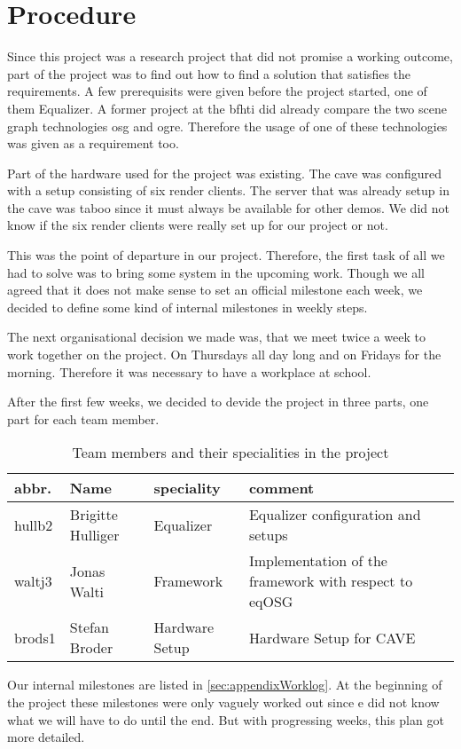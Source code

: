 \chapter{Procedure}

Since this project was a research project that did not promise a working outcome, part of the project was to find out how to find a solution that satisfies the requirements. 
A few prerequisits were given before the project started, one of them Equalizer. A former project at the \gls{bfhti} did already compare the two scene graph technologies \gls{osg} and \gls{ogre}. Therefore the usage of one of these technologies was given as a requirement too. 

Part of the hardware used for the project was existing. The \gls{cave} was configured with a setup consisting of six render clients. The server that was already setup in the \gls{cave} was taboo since it must always be available for other demos. We did not know if the six render clients were really set up for our project or not. 

This was the point of departure in our project. Therefore, the first task of all we had to solve was to bring some system in the upcoming work.
Though we all agreed that it does not make sense to set an official milestone each week, we decided to define some kind of internal milestones in weekly steps. 

The next organisational decision we made was, that we meet twice a week to work together on the project. On Thursdays all day long and on Fridays for the morning. Therefore it was necessary to have a workplace at school.

After the first few weeks, we decided to devide the project in three parts, one part for each team member.

\begin{table}[H]
	\centering
	\begin{tabular}{|p{}|p{}|p{}|p{}|} 
		\hline \bfseries abbr. & \bfseries Name & \bfseries speciality & \bfseries comment \\
		\hline
		\hline hullb2 & Brigitte Hulliger & Equalizer & Equalizer configuration and setups \\
		\hline waltj3 & Jonas Walti & Framework & Implementation of the framework with respect to eqOSG \\
		\hline brods1 & Stefan Broder & Hardware Setup & Hardware Setup for CAVE \\
		\hline
	\end{tabular}
	\caption{Team members and their specialities in the project}
\end{table}

Our internal milestones are listed in \ref{sec:appendixWorklog}. At the beginning of the project these milestones were only vaguely worked out since e did not know what we will have to do until the end. But with progressing weeks, this plan got more detailed.


